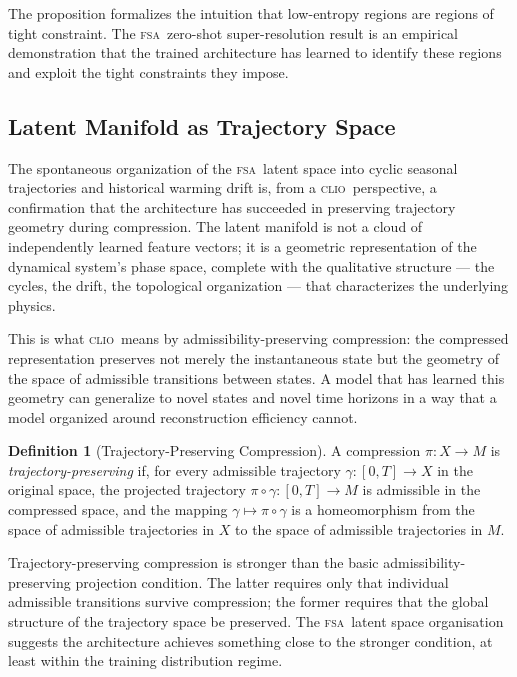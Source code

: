 \documentclass[11pt,a4paper]{article}
\theoremstyle{plain}
\theoremstyle{definition}
\newtheorem{definition}[theorem]{Definition}
\theoremstyle{remark}
\newcommand{\CLIO}{\textup{\textsc{clio}}}
\newcommand{\FSA}{\textup{\textsc{fsa}}}
\begin{document}
The proposition formalizes the intuition that low-entropy regions are
regions of tight constraint. The \FSA\ zero-shot super-resolution result
is an empirical demonstration that the trained architecture has learned
to identify these regions and exploit the tight constraints they impose.

\subsection{Latent Manifold as Trajectory Space}

The spontaneous organization of the \FSA\ latent space into cyclic seasonal
trajectories and historical warming drift is, from a \CLIO\ perspective, a
confirmation that the architecture has succeeded in preserving trajectory
geometry during compression. The latent manifold is not a cloud of
independently learned feature vectors; it is a geometric representation of
the dynamical system's phase space, complete with the qualitative structure
--- the cycles, the drift, the topological organization --- that
characterizes the underlying physics.

This is what \CLIO\ means by admissibility-preserving compression: the
compressed representation preserves not merely the instantaneous state but
the geometry of the space of admissible transitions between states. A
model that has learned this geometry can generalize to novel states and
novel time horizons in a way that a model organized around reconstruction
efficiency cannot.

\begin{definition}[Trajectory-Preserving Compression]
A compression $\pi: X \to M$ is \emph{trajectory-preserving} if, for every
admissible trajectory $\gamma: [0,T] \to X$ in the original space, the
projected trajectory $\pi \circ \gamma: [0,T] \to M$ is admissible in the
compressed space, and the mapping $\gamma \mapsto \pi \circ \gamma$ is
a homeomorphism from the space of admissible trajectories in $X$ to the
space of admissible trajectories in $M$.
\end{definition}

Trajectory-preserving compression is stronger than the basic
admissibility-preserving projection condition. The latter requires only
that individual admissible transitions survive compression; the former
requires that the global structure of the trajectory space be preserved.
The \FSA\ latent space organisation suggests the architecture achieves
something close to the stronger condition, at least within the training
distribution regime.
\end{document}
